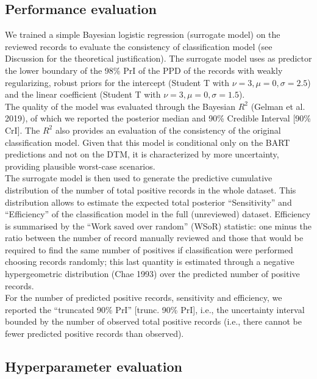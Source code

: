 \documentclass{article}
\begin{document}
\hypertarget{performance-evaluation}{%
\subsection{Performance evaluation}\label{performance-evaluation}}

We trained a simple Bayesian logistic regression (surrogate model) on
the reviewed records to evaluate the consistency of classification model
(see Discussion for the theoretical justification). The surrogate model
uses as predictor the lower boundary of the 98\% PrI of the PPD of the
records with weakly regularizing, robust priors for the intercept
(Student T with \(\nu=3,\mu=0,\sigma=2.5\)) and the linear coefficient
(Student T with \(\nu=3,\mu=0,\sigma=1.5\)).\\
The quality of the model was evaluated through the Bayesian \(R^2\)
(Gelman et al. 2019), of which we reported the posterior median and 90\%
Credible Interval {[}90\% CrI{]}. The \(R^2\) also provides an
evaluation of the consistency of the original classification model.
Given that this model is conditional only on the BART predictions and
not on the DTM, it is characterized by more uncertainty, providing
plausible worst-case scenarios.\\
The surrogate model is then used to generate the predictive cumulative
distribution of the number of total positive records in the whole
dataset. This distribution allows to estimate the expected total
posterior ``Sensitivity'' and ``Efficiency'' of the classification model
in the full (unreviewed) dataset. Efficiency is summarised by the ``Work
saved over random'' (WSoR) statistic: one minus the ratio between the
number of record manually reviewed and those that would be required to
find the same number of positives if classification were performed
choosing records randomly; this last quantity is estimated through a
negative hypergeometric distribution (Chae 1993) over the predicted
number of positive records.\\
For the number of predicted positive records, sensitivity and
efficiency, we reported the ``truncated 90\% PrI'' {[}trunc. 90\%
PrI{]}, i.e., the uncertainty interval bounded by the number of observed
total positive records (i.e., there cannot be fewer predicted positive
records than observed).

\hypertarget{hyperparameter-evaluation}{%
\subsection{Hyperparameter evaluation}\label{hyperparameter-evaluation}}
\end{document}
